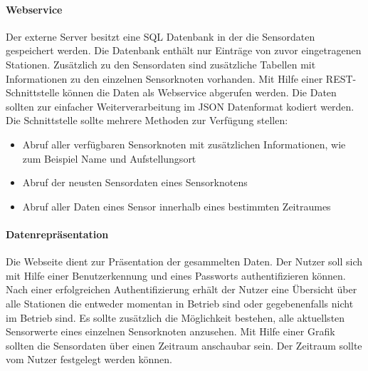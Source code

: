 \paragraph{Webservice}
Der externe Server besitzt eine SQL Datenbank in der die Sensordaten gespeichert werden. Die Datenbank enthält nur Einträge von zuvor eingetragenen Stationen. Zusätzlich zu den Sensordaten sind zusätzliche Tabellen mit Informationen zu den einzelnen Sensorknoten vorhanden. Mit Hilfe einer REST-Schnittstelle können die Daten als Webservice abgerufen werden. Die Daten sollten zur einfacher Weiterverarbeitung im JSON Datenformat kodiert werden. Die Schnittstelle sollte mehrere Methoden zur Verfügung stellen:
\begin{itemize}
	\item Abruf aller verfügbaren Sensorknoten mit zusätzlichen Informationen, wie zum Beispiel Name und Aufstellungsort
	\item Abruf der neusten Sensordaten eines Sensorknotens
	\item Abruf aller Daten eines Sensor innerhalb eines bestimmten Zeitraumes
\end{itemize}
\paragraph{Datenrepräsentation} Die Webseite dient zur Präsentation der gesammelten Daten. Der Nutzer soll sich mit Hilfe einer Benutzerkennung und eines Passworts authentifizieren können. Nach einer erfolgreichen Authentifizierung erhält der Nutzer eine Übersicht über alle Stationen die entweder momentan in Betrieb sind oder gegebenenfalls nicht im Betrieb sind. Es sollte zusätzlich die Möglichkeit bestehen, alle aktuellsten Sensorwerte eines einzelnen Sensorknoten anzusehen. Mit Hilfe einer Grafik sollten die Sensordaten über einen Zeitraum anschaubar sein. Der Zeitraum sollte vom Nutzer festgelegt werden können.
